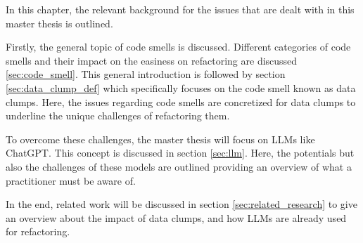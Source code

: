 

In this chapter, the relevant background for the issues that are dealt with in this master thesis is outlined. 

Firstly, the general topic of code smells is discussed. Different categories of code smells and their impact on the easiness on refactoring are discussed  \ref{sec:code_smell}. This general introduction is followed by  section \ref{sec:data_clump_def} which  specifically focuses on the code smell known as data clumps. Here, the issues regarding code smells  are concretized for data clumps to underline the unique challenges of refactoring them.

To overcome these challenges, the master thesis will focus on \acp{LLM} like ChatGPT. This concept is discussed in section \ref{sec:llm}. Here, the potentials but also the challenges of these models are outlined providing an overview of what a practitioner must be aware of.

In the end, related work  will be discussed in section \ref{sec:related_research} to give an overview about the impact of data clumps, and how \acp{LLM} are already used for refactoring. 








\begin{comment}





\end{comment}